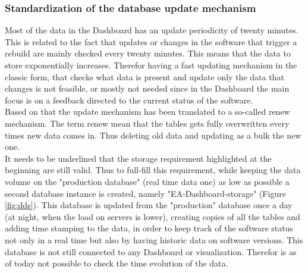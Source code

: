\documentclass[../main.tex]{subfiles}
\begin{document}
\subsubsection{Standardization of the database update mechanism}
Most of the data in the Dashboard has an update periodicity of twenty minutes. This is related to the fact that updates or changes in the software that trigger a rebuild are mainly checked every twenty minutes. This means that the data to store exponentially increases. Therefor having a fast updating mechanism in the classic form, that checks what data is present and update only the data that changes is not feasible, or mostly not needed since in the Dashboard the main focus is on a feedback directed to the current status of the software.\\
Based on that the update mechanism has been translated to a so-called renew mechanism. The term renew mean that the tables gets fully overwritten every times new data comes in. Thus deleting old data and updating as a bulk the new one.\\
It needs to be underlined that the storage requirement highlighted at the beginning are still valid. Thus to full-fill this requirement, while keeping the data volume on the "production database" (real time data one) as low as possible a second database instance is created, namely "EA-Dashboard-storage" (Figure \ref{fig:dds}). This database is updated from the "production" database once a day (at night, when the load on servers is lower), creating copies of all the tables and adding time stamping to the data, in order to keep track of the software status not only in a real time  but also by having historic data on software versions. This database is not still connected to any Dashboard or visualization. Therefor is as of today not possible to check the time evolution of the data. 
\end{document}
